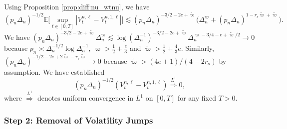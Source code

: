 \documentclass[ecta,nameyear,draft]{econsocart}
\def\wt{\widetilde}
\newcommand{\limL}{\stackrel{L^1}{\Longrightarrow}}
\newcommand{\1}{\mathbf 1}
\def\E{\mathbb{E}}
\numberwithin{equation}{section}
\newcommand{\Den}{\Delta_n}
\begin{document}
\begin{appendix}
Using Proposition \ref{prop:diff:nu_wtnu}, we have
\begin{equation*}
(p_n\Delta_n)^{-1/2} \E\bigg[\sup_{t\in[0,T]}|V^{n,\ell}_t -   V^{n,1,\ell}_t|\bigg]
\lesssim
(p_n\Delta_n)^{-3/2-2e+\wt \varpi}
\big(
\Delta_n^{\varpi} + (p_n\Delta_n)^{1-r_s\wt\varpi+\wt\varpi}\big).
\end{equation*}
We  have
$
(p_n\Delta_n)^{-3/2-2e+\wt\varpi} 
\Delta_n^{\varpi} 
\lesssim
\log(\Delta_n^{-1})^{-3/2-2e+\wt\varpi} 
\Delta_n^{\varpi-3/4-e+ \wt\varpi/2} \to 0
$
because $p_n\asymp\Den^{-1/2}\log \Den^{-1}$, $\varpi > \frac12 + \frac e3$ and $\wt \varpi > \frac12 + \frac43 e$.
Similarly,
$
(p_n\Delta_n)^{-1/2-2e + 2\wt\varpi-r_s\wt\varpi} \to 0
$
because   
$\wt\varpi > (4e+1)/(4-2r_s)$ by assumption. We have established
\begin{equation}\label{eq:step1} 
	(p_n\Delta_n)^{-1/2} (V^{n,\ell}_t -   V^{n,1,\ell}_t) \limL 0,
\end{equation}
where $\limL$ denotes uniform convergence in $L^1$ on $[0,T]$ for any fixed $T>0$.
\subsubsection*{Step 2: Removal of Volatility Jumps}


	


\end{appendix}
\end{document}
